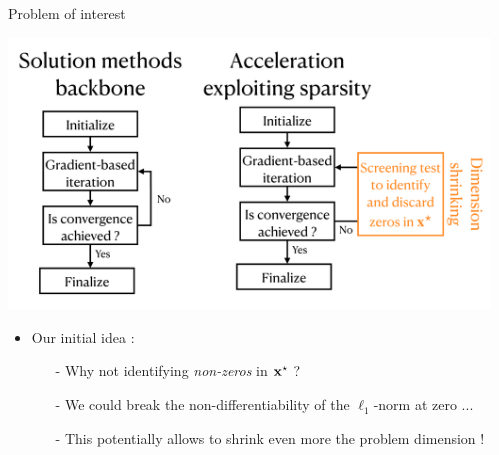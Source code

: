 \documentclass[final]{beamer}
\newcommand{\emphone}[1]{\textit{\color{norange}#1}}
\newlength{\sepwid}
\newlength{\onecolwid}
\begin{document}
\begin{frame}[t]
\begin{columns}[t]
\begin{column}{\onecolwid}
\begin{block}{Problem of interest}
\begin{itemize}
        \end{itemize}
        \includegraphics[width=\linewidth]{solution-method.pdf}
        \vspace{-1cm}
        \begin{itemize}
            \item \hspace{0.1in} Our initial idea :
            \begin{itemize}
                \normalsize \item[-] \hspace{0.1in} \normalsize Why not identifying \emphone{non-zeros} in $\mathbf{x}^\star$ ?
                \item[-] \hspace{0.1in} \normalsize We could break the non-differentiability of the $\ell_1$-norm at zero ...
                \item[-] \hspace{0.1in} \normalsize This potentially allows to shrink even more the problem dimension !
            \end{itemize}
        \end{itemize}
    \end{block}
\end{column}

\begin{column}{\sepwid}\end{column}


\end{columns}
\end{frame}
\end{document}
